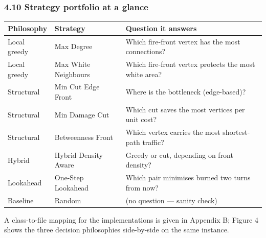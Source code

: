 \documentclass[
  11pt,
]{article}
\newcounter{none} %
\begin{document}
\subsubsection{4.10 Strategy portfolio at a
glance}\label{strategy-portfolio-at-a-glance}

{\def\LTcaptype{none} %
\begin{longtable}[]{@{}
  >{\raggedright\arraybackslash}p{}
  >{\raggedright\arraybackslash}p{}
  >{\raggedright\arraybackslash}p{}@{}}
\toprule\noalign{}
\begin{minipage}[b]{\linewidth}\raggedright
Philosophy
\end{minipage} & \begin{minipage}[b]{\linewidth}\raggedright
Strategy
\end{minipage} & \begin{minipage}[b]{\linewidth}\raggedright
Question it answers
\end{minipage} \\
\midrule\noalign{}
\endhead
\bottomrule\noalign{}
\endlastfoot
Local greedy & Max Degree & Which fire-front vertex has the most
connections? \\
Local greedy & Max White Neighbours & Which fire-front vertex protects
the most white area? \\
Structural & Min Cut Edge Front & Where is the bottleneck
(edge-based)? \\
Structural & Min Damage Cut & Which cut saves the most vertices per unit
cost? \\
Structural & Betweenness Front & Which vertex carries the most
shortest-path traffic? \\
Hybrid & Hybrid Density Aware & Greedy or cut, depending on front
density? \\
Lookahead & One-Step Lookahead & Which pair minimises burned two turns
from now? \\
Baseline & Random & (no question --- sanity check) \\
\end{longtable}
}

A class-to-file mapping for the implementations is given in Appendix B;
Figure 4 shows the three decision philosophies side-by-side on the same
instance.
\end{document}
